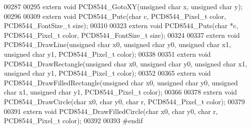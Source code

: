 \begin{DoxyCode}
00287 
00295 \textcolor{keyword}{extern} \textcolor{keywordtype}{void} PCD8544\_GotoXY(\textcolor{keywordtype}{unsigned} \textcolor{keywordtype}{char} x, \textcolor{keywordtype}{unsigned} \textcolor{keywordtype}{char} y);
00296 
00309 \textcolor{keyword}{extern} \textcolor{keywordtype}{void} PCD8544\_Putc(\textcolor{keywordtype}{char} c, PCD8544\_Pixel\_t color, PCD8544\_FontSize\_t size);
00310 
00323 \textcolor{keyword}{extern} \textcolor{keywordtype}{void} PCD8544\_Puts(\textcolor{keywordtype}{char} *c, PCD8544\_Pixel\_t color, PCD8544\_FontSize\_t size);
00324 
00337 \textcolor{keyword}{extern} \textcolor{keywordtype}{void} PCD8544\_DrawLine(\textcolor{keywordtype}{unsigned} \textcolor{keywordtype}{char} x0, \textcolor{keywordtype}{unsigned} \textcolor{keywordtype}{char} y0, \textcolor{keywordtype}{unsigned} \textcolor{keywordtype}{char} x1, \textcolor{keywordtype}{unsigned} \textcolor{keywordtype}{char} y1, 
      PCD8544\_Pixel\_t color);
00338 
00351 \textcolor{keyword}{extern} \textcolor{keywordtype}{void} PCD8544\_DrawRectangle(\textcolor{keywordtype}{unsigned} \textcolor{keywordtype}{char} x0, \textcolor{keywordtype}{unsigned} \textcolor{keywordtype}{char} y0, \textcolor{keywordtype}{unsigned} \textcolor{keywordtype}{char} x1, \textcolor{keywordtype}{unsigned} \textcolor{keywordtype}{char} y1, 
      PCD8544\_Pixel\_t color);
00352 
00365 \textcolor{keyword}{extern} \textcolor{keywordtype}{void} PCD8544\_DrawFilledRectangle(\textcolor{keywordtype}{unsigned} \textcolor{keywordtype}{char} x0, \textcolor{keywordtype}{unsigned} \textcolor{keywordtype}{char} y0, \textcolor{keywordtype}{unsigned} \textcolor{keywordtype}{char} x1, \textcolor{keywordtype}{unsigned} \textcolor{keywordtype}{char}
       y1, PCD8544\_Pixel\_t color);
00366 
00378 \textcolor{keyword}{extern} \textcolor{keywordtype}{void} PCD8544\_DrawCircle(\textcolor{keywordtype}{char} x0, \textcolor{keywordtype}{char} y0, \textcolor{keywordtype}{char} r, PCD8544\_Pixel\_t color);
00379 
00391 \textcolor{keyword}{extern} \textcolor{keywordtype}{void} PCD8544\_DrawFilledCircle(\textcolor{keywordtype}{char} x0, \textcolor{keywordtype}{char} y0, \textcolor{keywordtype}{char} r, PCD8544\_Pixel\_t color);
00392 
00393 \textcolor{preprocessor}{#endif}
\end{DoxyCode}
